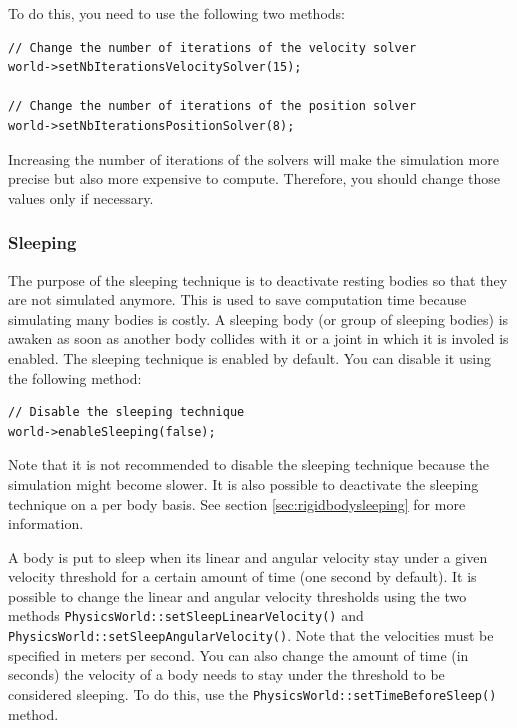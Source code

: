 \documentclass[a4paper,12pt]{article}
\begin{document}
    To do this, you need to use the following two methods: \\

    \begin{lstlisting}
// Change the number of iterations of the velocity solver
world->setNbIterationsVelocitySolver(15);

// Change the number of iterations of the position solver
world->setNbIterationsPositionSolver(8);
  \end{lstlisting}

    \vspace{0.6cm}

    Increasing the number of iterations of the solvers will make the simulation more precise but also more expensive to compute. Therefore, you should change
    those values only if necessary.

    \subsubsection{Sleeping}
    \label{sec:sleeping}

    The purpose of the sleeping technique is to deactivate resting bodies so that they are not simulated anymore. This is used to save computation
    time because simulating many bodies is costly. A sleeping body (or group of sleeping bodies) is awaken as soon as another body collides with it or
    a joint in which it is involed is enabled. The sleeping technique is enabled by default. You can disable it using the following method: \\

    \begin{lstlisting}
// Disable the sleeping technique
world->enableSleeping(false);
  \end{lstlisting}

    \vspace{0.6cm}

    Note that it is not recommended to disable the sleeping technique because the simulation might become slower. It is also possible to deactivate
    the sleeping technique on a per body basis. See section \ref{sec:rigidbodysleeping} for more information. \\

    \begin{sloppypar}
      A body is put to sleep when its linear and angular velocity stay under a given velocity threshold for a certain amount of time
      (one second by default). It is possible to change the linear and angular velocity thresholds using the two methods
      \texttt{PhysicsWorld::setSleepLinearVelocity()} and \texttt{PhysicsWorld::setSleepAngularVelocity()}.  Note that the velocities must
      be specified in meters per second. You can also change the amount of time (in seconds) the velocity of a body needs to stay under the
      threshold to be considered sleeping. To do this, use the \texttt{PhysicsWorld::setTimeBeforeSleep()} method.
   \end{sloppypar}
\end{document}
